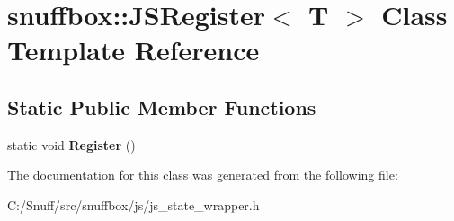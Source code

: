 \hypertarget{classsnuffbox_1_1_j_s_register}{\section{snuffbox\-:\-:J\-S\-Register$<$ T $>$ Class Template Reference}
\label{classsnuffbox_1_1_j_s_register}
}
\subsection*{Static Public Member Functions}
\begin{DoxyCompactItemize}
\item 
\hypertarget{classsnuffbox_1_1_j_s_register_ae81dc8ee576fd0c290debba976bba049}{static void {\bfseries Register} ()}\label{classsnuffbox_1_1_j_s_register_ae81dc8ee576fd0c290debba976bba049}

\end{DoxyCompactItemize}


The documentation for this class was generated from the following file\-:\begin{DoxyCompactItemize}
\item 
C\-:/\-Snuff/src/snuffbox/js/js\-\_\-state\-\_\-wrapper.\-h\end{DoxyCompactItemize}
